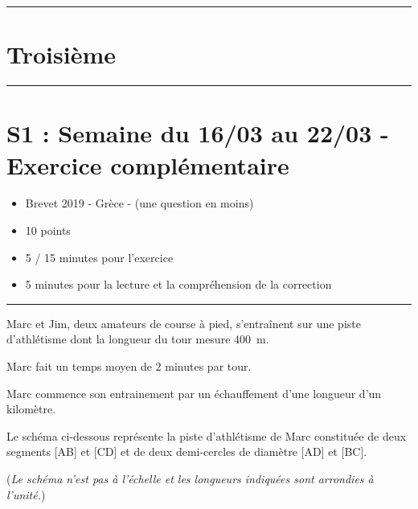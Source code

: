 \documentclass[11pt]{article}
\newcommand{\horrule}[1]{\rule{\linewidth}{#1}} %
\begin{document}

\newtheorem{Definition}{Définition}
\newtheorem{Theorem}{Théorème}
\newtheorem{Proposition}{Propriété}

\renewcommand{\labelitemi}{$\bullet$}
\renewcommand{\labelitemii}{$\circ$}

\setlength{\columnseprule}{1pt}

\horrule{2px}
\section*{Troisième}
\horrule{2px}

\section*{S1 : Semaine du 16/03 au 22/03 - Exercice complémentaire}

\begin{itemize}
  \item Brevet 2019 - Grèce - (une question en moins)
  \item 10 points
  \item 5 / 15 minutes pour l'exercice
  \item 5 minutes pour la lecture et la compréhension de la correction
\end{itemize}

 \horrule{2px}


Marc et Jim, deux amateurs de course à pied, s'entraînent sur une piste d'athlétisme dont la longueur du tour mesure $400$~m. 

Marc fait un temps moyen de $2$ minutes par tour. 

Marc commence son entrainement par un échauffement d'une longueur d'un kilomètre. 

Le schéma ci-dessous représente la piste d'athlétisme de Marc constituée de deux segments [AB] et [CD] et de deux demi-cercles de diamètre [AD] et [BC]. 

(\emph{Le schéma n'est pas à l'échelle et les longueurs indiquées sont arrondies à l'unité.}) 

\medskip
\end{document}

